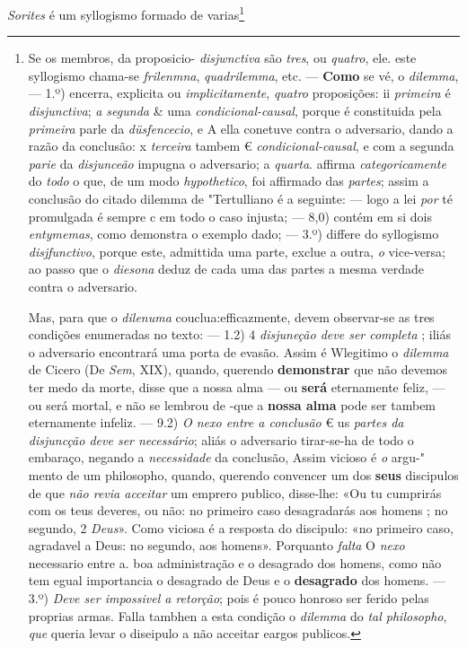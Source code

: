  
\emph{Sorites} é um syllogismo formado de varias\footnote{Se os membros, da proposicio- \emph{disjwnctiva} são \emph{tres}, ou \emph{quatro}, ele. este syllogismo chama-se \emph{frilenmna}, \emph{quadrilemma}, etc. --- \textbf{Como} se vé, o \emph{dilemma}, --- 1.º) encerra, explicita ou \emph{implicitamente}, \emph{quatro} proposições: ii \emph{primeira} é \emph{disjunctiva}; \emph{a segunda} \& uma \emph{condicional-causal}, porque é constituida pela \emph{primeira} parle da \emph{düsfencecio}, e A ella conetuve contra o adversario, dando a razão da conclusão: x \emph{terceira} tambem € \emph{condicional-causal}, e com a segunda \emph{parie} da \emph{disjunceão} impugna o adversario; a \emph{quarta}. affirma \emph{categoricamente} do \emph{todo} o que, de um modo \emph{hypothetico}, foi affirmado das \emph{partes}; assim a conclusão do citado dilemma de "Tertulliano é a seguinte: --- logo a lei \emph{por} té promulgada é sempre c em todo o caso injusta; --- 8,0) contém em si dois \emph{entymemas}, como demonstra o exemplo dado; --- 3.º) differe do syllogismo \emph{disjfunctivo}, porque este, admittida uma parte, exclue a outra, \emph{o} vice-versa; ao passo que o \emph{diesona} deduz de cada uma das partes a mesma verdade contra o adversario.\par Mas, para que o \emph{dilenuma} couclua:efficazmente, devem observar-se as tres condições enumeradas no texto: --- 1.2) 4 \emph{disjuneção deve ser completa} ; iliás o adversario encontrará uma porta de evasão. Assim é Wlegitimo o \emph{dilemma} de Cicero (De \emph{Sem}, XIX), quando, querendo \textbf{demonstrar} que não devemos ter medo da morte, disse que a nossa alma --- ou \textbf{será} eternamente feliz, --- ou será mortal, e não se lembrou de -que a \textbf{nossa alma} pode ser tambem eternamente infeliz. --- 9.2) \emph{O nexo entre a conclusão} € us \emph{partes da disjuncção deve ser necessário}; aliás o adversario tirar-se-ha de todo o embaraço, negando a \emph{necessidade} da conclusão, Assim vicioso é \emph{o} argu-" mento de um philosopho, quando, querendo convencer um dos \textbf{seus} discipulos de que \emph{não revia acceitar} um emprero publico, disse-lhe: «Ou tu cumprirás com os teus deveres, ou não: no primeiro caso desagradarás aos homens ; no segundo, 2 \emph{Deus}». Como viciosa é a resposta do discipulo: «no primeiro caso, agradavel a Deus: no segundo, aos homens». Porquanto \emph{falta} O \emph{nexo} necessario entre a. boa administração e o desagrado dos homens, como não tem egual importancia o desagrado de Deus e o \textbf{desagrado} dos homens. --- 3.º) \emph{Deve ser impossivel a retorção}; pois é pouco honroso ser ferido pelas proprias armas. Falla tambhen a esta condição o \emph{dilemma} do \emph{tal philosopho}, \emph{que} queria levar o diseipulo a não acceitar eargos publicos.}

